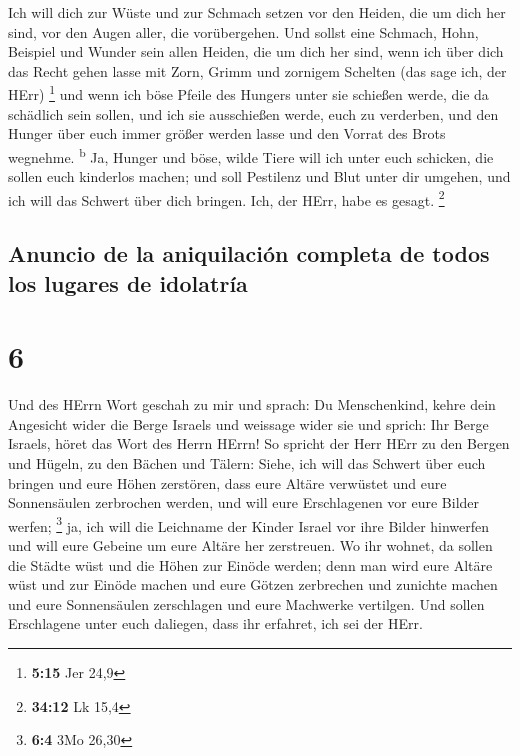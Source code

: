  Ich will dich zur Wüste und zur Schmach setzen vor den
Heiden, die um dich her sind, vor den Augen aller, die vorübergehen.
 Und sollst eine Schmach, Hohn, Beispiel und Wunder sein
allen Heiden, die um dich her sind, wenn ich über dich das Recht gehen
lasse mit Zorn, Grimm und zornigem Schelten (das sage ich, der HErr)
\footnote{\textbf{5:15} Jer 24,9}  und wenn ich böse
Pfeile des Hungers unter sie schießen werde, die da schädlich sein
sollen, und ich sie ausschießen werde, euch zu verderben, und den Hunger
über euch immer größer werden lasse und den Vorrat des Brots wegnehme.
\textsuperscript{b}  Ja, Hunger und böse, wilde Tiere
will ich unter euch schicken, die sollen euch kinderlos machen; und soll
Pestilenz und Blut unter dir umgehen, und ich will das Schwert über dich
bringen. Ich, der HErr, habe es gesagt. \footnote{\textbf{34:12} Lk 15,4}

\hypertarget{anuncio-de-la-aniquilaciuxf3n-completa-de-todos-los-lugares-de-idolatruxeda}{%
\subsection{Anuncio de la aniquilación completa de todos los lugares de
idolatría}\label{anuncio-de-la-aniquilaciuxf3n-completa-de-todos-los-lugares-de-idolatruxeda}}

\hypertarget{section-5}{%
\section{6}\label{section-5}}

 Und des HErrn Wort geschah zu mir und sprach:
 Du Menschenkind, kehre dein Angesicht wider die Berge
Israels und weissage wider sie  und sprich: Ihr Berge
Israels, höret das Wort des Herrn HErrn! So spricht der Herr HErr zu den
Bergen und Hügeln, zu den Bächen und Tälern: Siehe, ich will das Schwert
über euch bringen und eure Höhen zerstören,  dass eure
Altäre verwüstet und eure Sonnensäulen zerbrochen werden, und will eure
Erschlagenen vor eure Bilder werfen; \footnote{\textbf{6:4} 3Mo 26,30}
 ja, ich will die Leichname der Kinder Israel vor ihre
Bilder hinwerfen und will eure Gebeine um eure Altäre her zerstreuen.
 Wo ihr wohnet, da sollen die Städte wüst und die Höhen
zur Einöde werden; denn man wird eure Altäre wüst und zur Einöde machen
und eure Götzen zerbrechen und zunichte machen und eure Sonnensäulen
zerschlagen und eure Machwerke vertilgen.  Und sollen
Erschlagene unter euch daliegen, dass ihr erfahret, ich sei der HErr.

